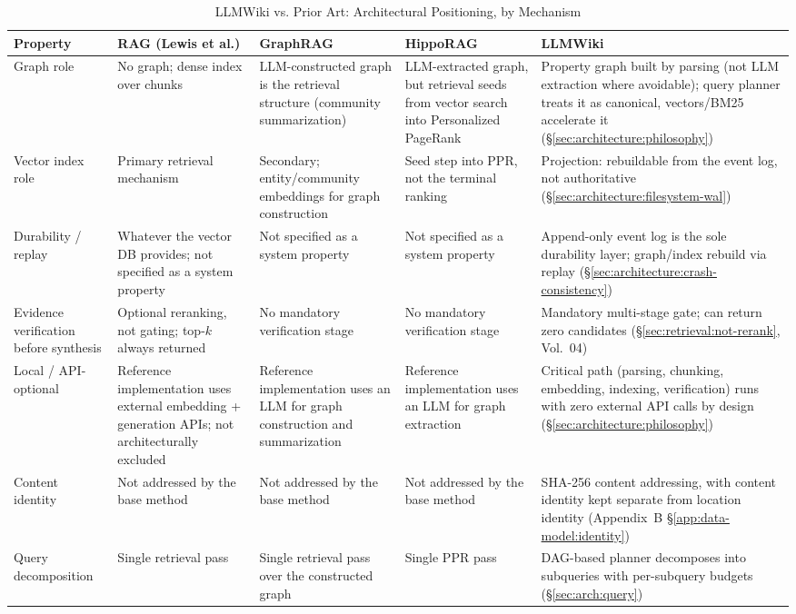 \begin{table}[htbp]
\centering
\caption{LLMWiki vs. Prior Art: Architectural Positioning, by Mechanism}
\label{tab:arch:prior-art}
\begin{adjustbox}{max width=\textwidth}
\begin{tabular}{p{3.1cm}p{3.6cm}p{3.6cm}p{3.6cm}p{3.6cm}}
\toprule
\textbf{Property} & \textbf{RAG (Lewis et al.)} & \textbf{GraphRAG} & \textbf{HippoRAG} & \textbf{LLMWiki} \\
\midrule
Graph role &
No graph; dense index over chunks &
LLM-constructed graph is the retrieval structure (community summarization) &
LLM-extracted graph, but retrieval seeds from vector search into Personalized PageRank &
Property graph built by parsing (not LLM extraction where avoidable); query planner treats it as canonical, vectors/BM25 accelerate it (\S\ref{sec:architecture:philosophy}) \\
Vector index role &
Primary retrieval mechanism &
Secondary; entity/community embeddings for graph construction &
Seed step into PPR, not the terminal ranking &
Projection: rebuildable from the event log, not authoritative (\S\ref{sec:architecture:filesystem-wal}) \\
Durability / replay &
Whatever the vector DB provides; not specified as a system property &
Not specified as a system property &
Not specified as a system property &
Append-only event log is the sole durability layer; graph/index rebuild via replay (\S\ref{sec:architecture:crash-consistency}) \\
Evidence verification before synthesis &
Optional reranking, not gating; top-$k$ always returned &
No mandatory verification stage &
No mandatory verification stage &
Mandatory multi-stage gate; can return zero candidates (\S\ref{sec:retrieval:not-rerank}, Vol.~04) \\
Local / API-optional &
Reference implementation uses external embedding + generation APIs; not architecturally excluded &
Reference implementation uses an LLM for graph construction and summarization &
Reference implementation uses an LLM for graph extraction &
Critical path (parsing, chunking, embedding, indexing, verification) runs with zero external API calls by design (\S\ref{sec:architecture:philosophy}) \\
Content identity &
Not addressed by the base method &
Not addressed by the base method &
Not addressed by the base method &
SHA-256 content addressing, with content identity kept separate from location identity (Appendix~B \S\ref{app:data-model:identity}) \\
Query decomposition &
Single retrieval pass &
Single retrieval pass over the constructed graph &
Single PPR pass &
DAG-based planner decomposes into subqueries with per-subquery budgets (\S\ref{sec:arch:query}) \\
\bottomrule
\end{tabular}
\end{adjustbox}
\end{table}

